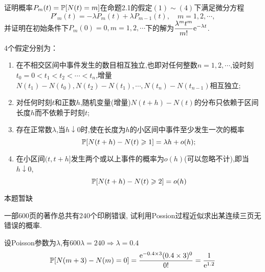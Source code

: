 \begin{problem}{2.5}
证明概率$P_m(t) = \mathbb{P}[N(t) = m]$在命题2.1的假定$(1)\sim(4)$下满足微分方程
\[P'_m(t) = -\lambda P_m(t) + \lambda P_{m-1}(t),\quad m=1,2,\cdots, \]
并证明在初始条件下$P_m(0) = 0, m = 1,2,\cdots$下的解为$\displaystyle \frac{{\lambda}^m t^m}{m!}\mathrm{e}^{-\lambda t}$.
\par 4个假定分别为：
\begin{enumerate}[label=(\arabic*)]
	\item 在不相交区间中事件发生的数目相互独立,也即对任何整数$n=1,2,\cdots $,设时刻$t_0=0<t_1<t_2<\cdots <t_n$,增量$N(t_1)-N(t_0),N(t_2)-N(t_1),\cdots ,N(t_n)-N(t_{n-1})$相互独立;
	\item 对任何时刻$t$和正数$h$,随机变量(增量)$N(t+h)-N(t)$的分布只依赖于区间长度$h$而不依赖于时刻$t$;
	\item 存在正常数$\lambda $,当$h\downarrow 0$时,使在长度为$h$的小区间中事件至少发生一次的概率\[\mathbb{P}[N(t+h)-N(t)\geqslant 1]=\lambda h+o(h);\]
	\item 在小区间$(t,t+h]$发生两个或以上事件的概率为$o(h)$(可以忽略不计),即当$h\downarrow 0$,\[\mathbb{P}[N(t+h)-N(t)\geqslant 2]=o(h)\]
\end{enumerate}
\end{problem}
\begin{solution}
	本题暂缺
\end{solution}

\begin{problem}{2.6}
一部600页的著作总共有240个印刷错误, 试利用Possion过程近似求出某连续三页无错误的概率.
\end{problem}
\begin{solution}
	设Poisson参数为$\lambda $,有$600\lambda = 240 \Rightarrow \lambda = 0.4$
	\[\mathbb{P}[N(m+3)-N(m)=0]=\frac{\mathrm{e}^{-0.4\times 3}(0.4\times 3)^0}{0!} = \frac{1}{\mathrm{e}^{1.2}}\]
\end{solution}

